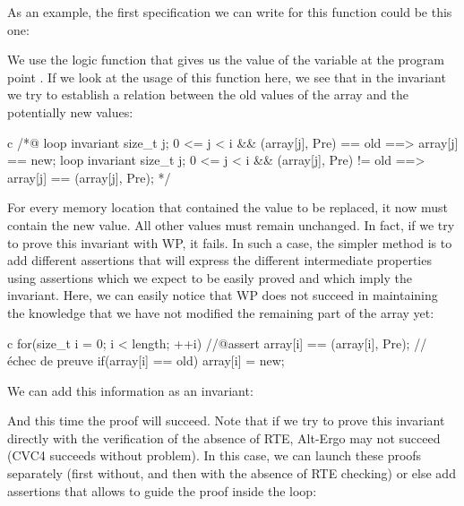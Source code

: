 As an example, the first specification we can write for this function
could be this one:






We use the logic function  that gives us the
value of the variable  at the program point .
If we look at the usage of this function here, we see that in the
invariant we try to establish a relation between the old values of the
array and the potentially new values:



\begin{CodeBlock}{c}
/*@
  loop invariant \forall size_t j; 0 <= j < i && \at(array[j], Pre) == old 
                   ==> array[j] == new;
  loop invariant \forall size_t j; 0 <= j < i && \at(array[j], Pre) != old 
                   ==> array[j] == \at(array[j], Pre);
*/
\end{CodeBlock}



For every memory location that contained the value to be replaced, it now must
contain the new value. All other values must remain unchanged. In fact, if we
try to prove this invariant with WP, it fails. In such a case, the simpler
method is to add different assertions that will express the different
intermediate properties using assertions which we expect to be easily proved
and which imply the invariant. Here, we can easily notice that WP does not
succeed in maintaining the knowledge that we have not modified the remaining
part of the array yet:




\begin{CodeBlock}{c}
for(size_t i = 0; i < length; ++i){
    //@assert array[i] == \at(array[i], Pre); // échec de preuve
    if(array[i] == old) array[i] = new;
}
\end{CodeBlock}



We can add this information as an invariant:






And this time the proof will succeed. Note that if we try to prove this
invariant directly with the verification of the absence of RTE, Alt-Ergo
may not succeed (CVC4 succeeds without problem). In this case, we can
launch these proofs separately (first without, and then with the absence
of RTE checking) or else add assertions that allows to guide the proof
inside the loop:



